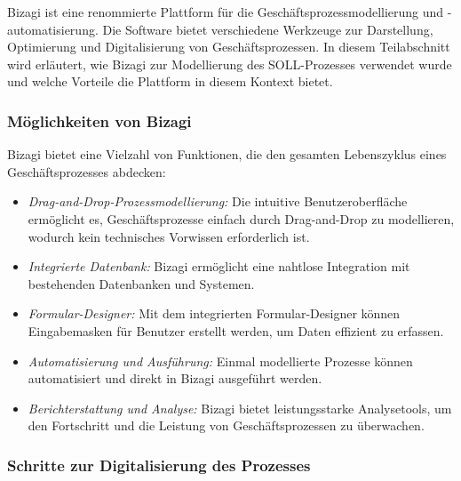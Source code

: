 \documentclass[12pt, a4paper]{article}
\begin{document}
Bizagi ist eine renommierte Plattform für die Geschäftsprozessmodellierung und -automatisierung. Die Software bietet verschiedene Werkzeuge zur Darstellung, 
Optimierung und Digitalisierung von Geschäftsprozessen. In diesem Teilabschnitt wird erläutert, wie Bizagi zur Modellierung des SOLL-Prozesses verwendet wurde und welche 
Vorteile die Plattform in diesem Kontext bietet.

\subsubsection{Möglichkeiten von Bizagi}

Bizagi bietet eine Vielzahl von Funktionen, die den gesamten Lebenszyklus eines Geschäftsprozesses abdecken:

\begin{itemize}
\item \textit{Drag-and-Drop-Prozessmodellierung:} Die intuitive Benutzeroberfläche ermöglicht es, Geschäftsprozesse einfach durch Drag-and-Drop zu modellieren, 
wodurch kein technisches Vorwissen erforderlich ist.
\item \textit{Integrierte Datenbank:} Bizagi ermöglicht eine nahtlose Integration mit bestehenden Datenbanken und Systemen.
\item \textit{Formular-Designer:} Mit dem integrierten Formular-Designer können Eingabemasken für Benutzer erstellt werden, um Daten effizient zu erfassen.
\item \textit{Automatisierung und Ausführung:} Einmal modellierte Prozesse können automatisiert und direkt in Bizagi ausgeführt werden.
\item \textit{Berichterstattung und Analyse:} Bizagi bietet leistungsstarke Analysetools, um den Fortschritt und die Leistung von Geschäftsprozessen zu überwachen.
\end{itemize}

\subsubsection{Schritte zur Digitalisierung des Prozesses}
\end{document}
